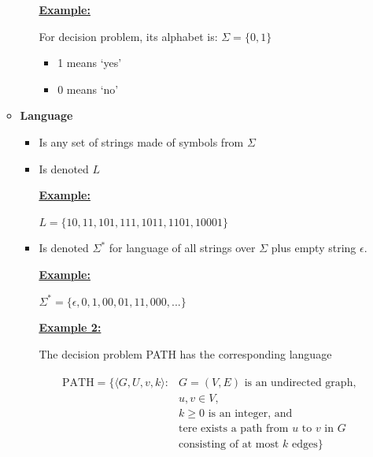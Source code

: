 \documentclass[12pt]{article}
\begin{document}
\begin{enumerate}[1.]
\begin{itemize}
\begin{itemize}
            \bigskip

            \underline{\textbf{Example:}}

            \bigskip

            For decision problem, its alphabet is: $\Sigma = \{0,1\}$

            \begin{itemize}
                \item 1 means `yes'
                \item 0 means `no'
            \end{itemize}
        \end{itemize}

        \item \textbf{Language}

        \begin{itemize}
            \item Is any set of strings made of symbols from $\Sigma$
            \item Is denoted $L$

            \bigskip

            \underline{\textbf{Example:}}

            \bigskip

            $L = \{10,11,101,111,1011,1101,10001\}$

            \bigskip

            \item Is denoted $\Sigma^*$ for language of all strings over $\Sigma$ plus empty string $\epsilon$.

            \bigskip

            \underline{\textbf{Example:}}

            \bigskip

            $\Sigma^* = \{\epsilon, 0,1,00,01,11,000,...\}$

            \bigskip

            \underline{\textbf{Example 2:}}

            \bigskip

            The decision problem PATH has the corresponding language

            \bigskip

            \begin{align*}
                \begin{split}\text{PATH} = \{\langle G,U,v,k \rangle:&  \text{$G = (V,E)$ is an undirected graph,}\\&\text{$u,v \in V$,}\\&\text{$k \geq 0$ is an integer, and}\\&\text{tere exists a path from $u$ to $v$ in $G$}\\&\text{consisting of at most $k$ edges}\}\end{split}
            \end{align*}
        \end{itemize}


\end{itemize}
\end{enumerate}
\end{document}
